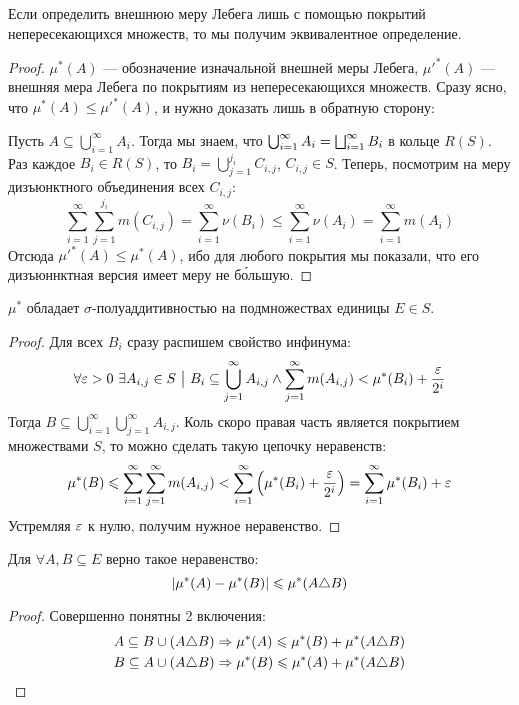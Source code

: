 \begin{proposition}
	Если определить внешнюю меру Лебега лишь с помощью покрытий непересекающихся множеств, то мы получим эквивалентное определение.
\end{proposition}

\begin{proof}
	$\mu^*(A)$ --- обозначение изначальной внешней меры Лебега, $\mu'^*(A)$ --- внешняя мера Лебега по покрытиям из непересекающихся множеств. Сразу ясно, что $\mu^*(A) \le \mu'^*(A)$, и нужно доказать лишь в обратную сторону:
	
	Пусть $A \subseteq \bigcup_{i = 1}^\infty A_i$. Тогда мы знаем, что $\bigcup_{i = 1}^\infty A_i = \bigsqcup_{i = 1}^\infty B_i$ в кольце $R(S)$. Раз каждое $B_i \in R(S)$, то $B_i = \bigcup_{j = 1}^{j_i} C_{i, j}$, $C_{i, j} \in S$. Теперь, посмотрим на меру дизъюнктного объединения всех $C_{i, j}$:
	\[
		\sum_{i = 1}^\infty \sum_{j = 1}^{j_i} m(C_{i, j}) = \sum_{i = 1}^\infty \nu(B_i) \le \sum_{i = 1}^\infty \nu(A_i) = \sum_{i = 1}^\infty m(A_i)
	\]
	Отсюда $\mu'^*(A) \le \mu^*(A)$, ибо для любого покрытия мы показали, что его дизъюннктная версия имеет меру не б\'{о}льшую.
\end{proof}

\begin{theorem}
	$\mu^*$ обладает $\sigma$-полуаддитивностью на подмножествах единицы $E \in S$.
\end{theorem}

\begin{proof}
	Для всех $B_i$ сразу распишем свойство инфинума:
	\[
		\forall \varepsilon > 0\ \exists A_{i, j} \in S \ \big|\  B_i \subseteq \bigcup_{j = 1}^\infty A_{i, j} \wedge \sum_{j = 1}^\infty m(A_{i, j}) < \mu^*(B_i) + \frac{\varepsilon}{2^i}
	\]
	Тогда $B \subseteq \bigcup_{i = 1}^\infty \bigcup_{j = 1}^\infty A_{i, j}$. Коль скоро правая часть является покрытием множествами $S$, то можно сделать такую цепочку неравенств:
	\[
		\mu^*(B) \leqslant \sum_{i = 1}^\infty \sum_{j = 1}^\infty m(A_{i, j}) < \sum_{i = 1}^\infty \left(\mu^*(B_i) + \frac{\varepsilon}{2^i}\right) = \sum_{i = 1}^\infty \mu^*(B_i) + \varepsilon
	\]
	Устремляя $\varepsilon$ к нулю, получим нужное неравенство.
\end{proof}

\begin{corollary}
	Для $\forall A, B \subseteq E$ верно такое неравенство:
	\[
		|\mu^*(A) - \mu^*(B)| \leqslant \mu^*(A \triangle B)
	\]
\end{corollary}

\begin{proof}
	Совершенно понятны 2 включения:
	\begin{align*}
		&{A \subseteq B \cup (A \triangle B) \Rightarrow \mu^*(A) \leqslant \mu^*(B) + \mu^*(A \triangle B)}
		\\
		&{B \subseteq A \cup (A \triangle B) \Rightarrow \mu^*(B) \leqslant \mu^*(A) + \mu^*(A \triangle B)}
	\end{align*}
\end{proof}

